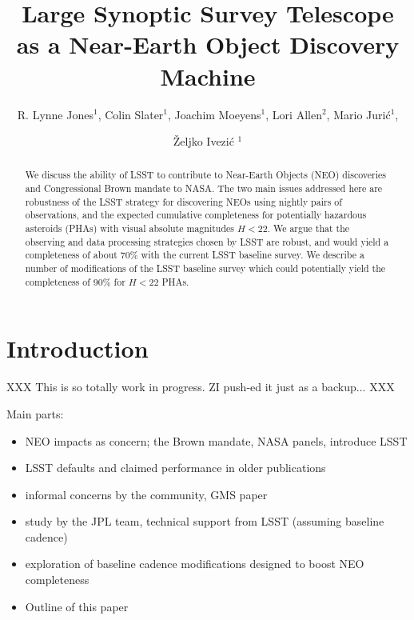 \documentclass[12pt,preprint]{aastex}
\begin{document}
\title{Large Synoptic Survey Telescope as a Near-Earth Object Discovery Machine}

\author{R. Lynne Jones$^1$, Colin Slater$^1$, Joachim Moeyens$^1$, 
Lori Allen$^2$, Mario Juri\'{c}$^1$,  \and \v{Z}eljko Ivezi\'{c} $^1$}



\begin{abstract}
We discuss the ability of LSST to contribute to Near-Earth Objects (NEO) discoveries and
Congressional Brown mandate to NASA. The two main issues addressed here are robustness 
of the LSST strategy for discovering NEOs using nightly pairs of observations, and the 
expected cumulative completeness for potentially hazardous asteroids (PHAs) with 
visual absolute magnitudes $H<22$.  We argue that the observing and data processing 
strategies chosen by LSST are robust, and would yield a completeness of about 70\% with 
the current LSST baseline survey. We describe a number of modifications of the LSST baseline 
survey which could potentially yield the completeness of 90\% for $H<22$ PHAs. 
\end{abstract}

\keywords{}

\section{Introduction}

XXX This is so totally work in progress. ZI push-ed it just as a backup... XXX


Main parts:
\begin{itemize}
\item NEO impacts as concern; the Brown mandate, NASA panels,
  introduce LSST 
\item LSST defaults and claimed performance in older publications
\item informal concerns by the community, GMS paper
\item study by the JPL team, technical support from LSST (assuming
  baseline cadence)
\item exploration of baseline cadence modifications designed to boost
    NEO completeness 
\item Outline of this paper
\end{itemize} 
\end{document}
